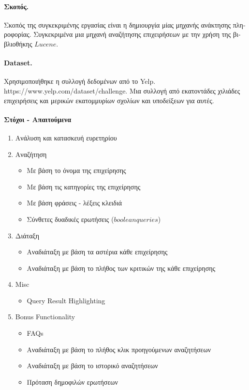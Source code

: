 \paragraph {\textgreek{Σκοπός.}}
\textgreek{Σκοπός της συγκεκριμένης εργασίας είναι η δημιουργία μίας μηχανής
ανάκτησης πληροφορίας. Συγκεκριμένα μια μηχανή αναζήτησης επιχειρήσεων
με την χρήση της βιβλιοθήκης $Lucene$.}

\paragraph{Dataset.}
\textgreek {
    Χρησιμοποιήθηκε η συλλογή δεδομένων από το }
    Yelp. \\ https://www.yelp.com/dataset/challenge.
\textgreek{
    Μια συλλογή από εκατοντάδες χιλιάδες επιχειρήσεις και μερικών εκατομμυρίων
    σχολίων και υποδείξεων για αυτές.
}

\paragraph{\textgreek{Στόχοι - Απαιτούμενα}}
\begin{enumerate}
    \item \textgreek{Ανάλυση και κατασκευή ευρετηρίου}
    \item \textgreek{Αναζήτηση}
        \begin{itemize}
            \item \textgreek {Με βάση το όνομα της επιχείρησης}
            \item \textgreek {Με βάση τις κατηγορίες της επιχείρησης}
            \item \textgreek {Με βάση φράσεις - λέξεις κλειδιά}
            \item \textgreek {Σύνθετες δυαδικές ερωτήσεις ($boolean queries$)}
        \end{itemize}
    \item \textgreek{Διάταξη}
        \begin{itemize}
            \item \textgreek{Αναδιάταξη με βάση τα αστέρια κάθε επιχείρησης}
            \item \textgreek{Αναδιάταξη με βάση το πλήθος των κριτικών της κάθε επιχείρησης}
        \end{itemize}
    \item Misc
        \begin{itemize}
            \item Query Result Highlighting
        \end{itemize}
    \item {Bonus Functionality}
        \begin{itemize}
            \item FAQs
            \item\textgreek{Αναδιάταξη με βάση το πλήθος κλικ προηγούμενων αναζητήσεων}
            \item\textgreek{Αναδιάταξη με βάση το ιστορικό αναζητήσεων}
            \item\textgreek{Πρόταση δημοφιλών ερωτήσεων}
        \end{itemize}
\end{enumerate}
